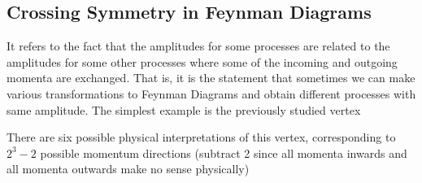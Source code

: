 \documentclass[11pt]{article}
\numberwithin{equation}{section}
\begin{document}
    \subsection{Crossing Symmetry in Feynman Diagrams}
    It refers to the fact that the amplitudes for some processes are related to the amplitudes for some other processes where some of the incoming and outgoing momenta are exchanged. That is, it is the statement that sometimes we can make various transformations to Feynman Diagrams and obtain different processes with same amplitude. The simplest example is the previously studied vertex 
    \begin{figure}[h]
        \centering
    \end{figure}
    There are six possible physical interpretations of this vertex, corresponding to \(2^3 - 2\) possible momentum directions (subtract 2 since all momenta inwards and all momenta outwards make no sense physically)
\end{document}
